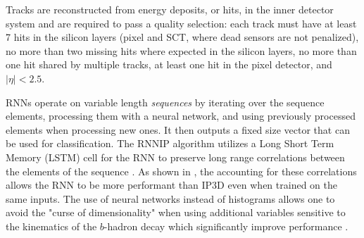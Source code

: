 
\def\figpath{figures/ftag/dips-note/}

Tracks are reconstructed from energy deposits, or hits, in the inner detector system and are required to pass a quality selection: 
each track must have at least 7 hits in the silicon layers (pixel and SCT, where dead sensors are not penalized), 
no more than two missing hits where expected in the silicon layers, 
no more than one hit shared by multiple tracks, 
at least one hit in the pixel detector, and $|\eta| < 2.5$. 




RNNs operate on variable length \emph{sequences} by iterating over the sequence elements, processing them with a neural network, and using previously processed elements when processing new ones. 
It then outputs a fixed size vector that can be used for classification. 
The RNNIP algorithm utilizes a Long Short Term Memory (LSTM) cell for the RNN to preserve long range correlations between the elements of the sequence \cite{LSTMs}. 
As shown in \cite{ATL-PHYS-PUB-2017-003}, the accounting for these correlations allows the RNN to be more performant than IP3D even when trained on the same inputs.
The use of neural networks instead of histograms allows one to avoid the "curse of dimensionality" when using additional variables sensitive to the kinematics of the $b$-hadron decay which significantly improve performance \cite{ATL-PHYS-PUB-2017-003}.


